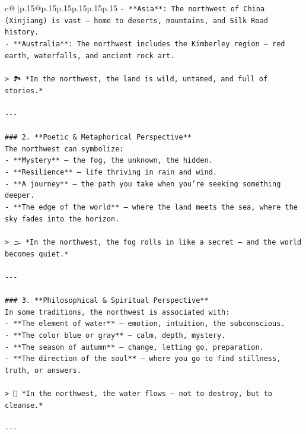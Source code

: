 \documentclass{article}
\begin{document}
{\begin{supertabular}{c@{$\;$}|p{.15\linewidth}@{}p{.15\linewidth}p{.15\linewidth}p{.15\linewidth}p{.15\linewidth}p{.15\linewidth}}
{{{\texttt{{-} **Asia**: The northwest of China (Xinjiang) is vast — home to deserts, mountains, and Silk Road history.} \\
\texttt{{-} **Australia**: The northwest includes the Kimberley region — red earth, waterfalls, and ancient rock art.} \\
\\ 
\texttt{> 🏞️ *In the northwest, the land is wild, untamed, and full of stories.*} \\
\\ 
\texttt{{-}{-}{-}} \\
\\ 
\texttt{\#\#\# 2. **Poetic \& Metaphorical Perspective**  } \\
\texttt{The northwest can symbolize:} \\
\texttt{{-} **Mystery** — the fog, the unknown, the hidden.} \\
\texttt{{-} **Resilience** — life thriving in rain and wind.} \\
\texttt{{-} **A journey** — the path you take when you’re seeking something deeper.} \\
\texttt{{-} **The edge of the world** — where the land meets the sea, where the sky fades into the horizon.} \\
\\ 
\texttt{> 🌫️ *In the northwest, the fog rolls in like a secret — and the world becomes quiet.*} \\
\\ 
\texttt{{-}{-}{-}} \\
\\ 
\texttt{\#\#\# 3. **Philosophical \& Spiritual Perspective**  } \\
\texttt{In some traditions, the northwest is associated with:} \\
\texttt{{-} **The element of water** — emotion, intuition, the subconscious.} \\
\texttt{{-} **The color blue or gray** — calm, depth, mystery.} \\
\texttt{{-} **The season of autumn** — change, letting go, preparation.} \\
\texttt{{-} **The direction of the soul** — where you go to find stillness, truth, or answers.} \\
\\ 
\texttt{> 🌊 *In the northwest, the water flows — not to destroy, but to cleanse.*} \\
\\ 
\texttt{{-}{-}{-}} \\
}}}
\end{supertabular}}
\end{document}

